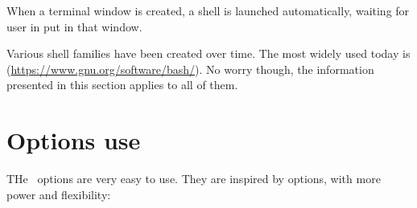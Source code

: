 When a terminal window is created, a shell is launched automatically, waiting for user in put in that window.

Various shell families have been created over time. The most widely used today is  (\url{https://www.gnu.org/software/bash/}). No worry though, the information presented in this section applies to all of them.


\chapter{Options use}

THe \oahRepr\ options are very easy to use. They are inspired by  options, with more power and flexibility:
